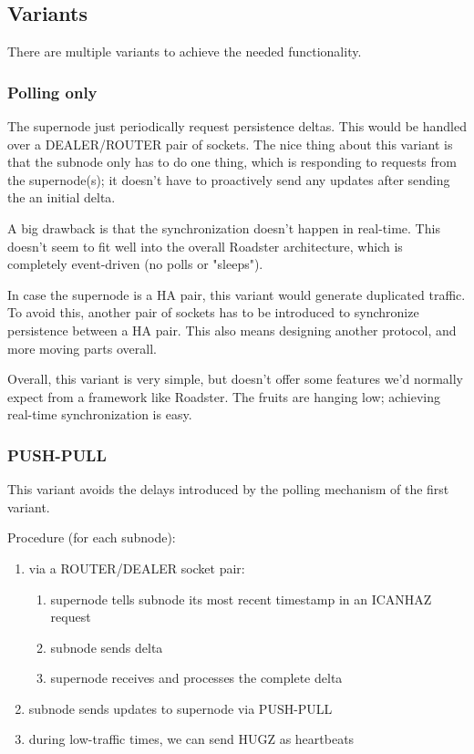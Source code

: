 \subsection{Variants}

There are multiple variants to achieve the needed functionality.

\subsubsection{Polling only}
The supernode just periodically request persistence
deltas. This would be handled over a DEALER/ROUTER pair of sockets. The nice
thing about this variant is that the subnode only has to do one thing, which is
responding to requests from the supernode(s); it doesn't have to proactively
send any updates after sending the an initial delta.

A big drawback is that the synchronization doesn't happen in real-time. This
doesn't seem to fit well into the overall Roadster architecture, which is
completely event-driven (no polls or "sleeps").

In case the supernode is a HA pair, this variant would generate duplicated
traffic. To avoid this, another pair of sockets has to be introduced to
synchronize persistence between a HA pair. This also means designing another
protocol, and more moving parts overall.

Overall, this variant is very simple, but doesn't offer some features we'd
normally expect from a framework like Roadster. The fruits are hanging low;
achieving real-time synchronization is easy.

\subsubsection{PUSH-PULL}
This variant avoids the delays introduced by the polling mechanism of the first variant.

Procedure (for each subnode):
\begin{enumerate}
	\item via a ROUTER/DEALER socket pair:
		\begin{enumerate}
			\item supernode tells subnode its most recent timestamp in an ICANHAZ request
			\item subnode sends delta
			\item supernode receives and processes the complete delta
		\end{enumerate}
	\item subnode sends updates to supernode via PUSH-PULL
	\item during low-traffic times, we can send HUGZ as heartbeats
\end{enumerate}

